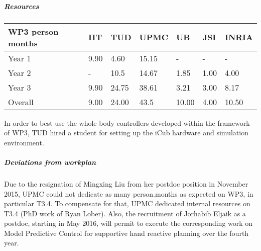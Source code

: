 
\subparagraph{Resources}

\begin{center}
\begin{tabular}{|C{1.5cm}|C{1.5cm}|C{1.5cm}|C{2cm}|C{2cm}|C{2cm}|C{2cm}|}
\hline
\footnotesize \textbf{WP3 person months} & \footnotesize \textbf{IIT}&\footnotesize \textbf{TUD}&\footnotesize \textbf{UPMC}& \footnotesize \textbf{UB} &\footnotesize \textbf{JSI} &\footnotesize \textbf{INRIA} \\ \hline
\footnotesize Year 1 &  9.90 & 4.60 & 15.15 & - & - &  -   \\  \hline
\footnotesize Year 2 &  - & 10.5 & 14.67 & 1.85 & 1.00 &  4.00  \\  \hline
\footnotesize Year 3 &  9.90 & 24.75 & 38.61 & 3.21 & 3.00 & 8.17\\  
\hline \hline
\footnotesize Overall &  9.00 & 24.00 & 43.5 & 10.00 & 4.00 & 10.50 \\ \hline
\end{tabular}
\end{center}

In order to best use the whole-body controllers developed within the framework of WP3, TUD hired a student for setting up the iCub hardware and simulation environment.

\subparagraph{Deviations from workplan}

Due to the resignation of Mingxing Liu from her postdoc position in November 2015, UPMC could not dedicate as many person.months as expected on WP3, in particular T3.4. To compensate for that, UPMC dedicated internal resources on T3.4 (PhD work of Ryan Lober). Also, the recruitment of Jorhabib Eljaik as a postdoc, starting in May 2016, will permit to execute the corresponding work on Model Predictive Control for supportive hand reactive planning over the fourth year. 



